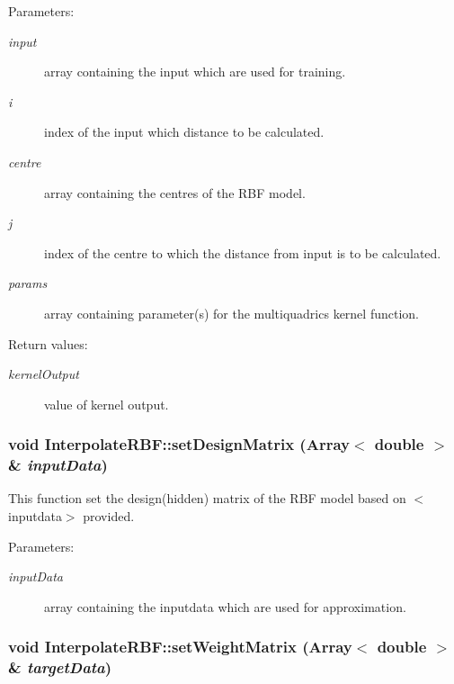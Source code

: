 \begin{Desc}
\item[Parameters:]
\begin{description}
\item[{\em input}]array containing the input which are used for training. \item[{\em i}]index of the input which distance to be calculated. \item[{\em centre}]array containing the centres of the RBF model. \item[{\em j}]index of the centre to which the distance from input is to be calculated. \item[{\em params}]array containing parameter(s) for the multiquadrics kernel function. \end{description}
\end{Desc}
\begin{Desc}
\item[Return values:]
\begin{description}
\item[{\em kernel\-Output}]value of kernel output.\end{description}
\end{Desc}
\subsubsection{\setlength{\rightskip}{0pt plus 5cm}void Interpolate\-RBF::set\-Design\-Matrix (Array$<$ double $>$ \& {\em input\-Data})}\label{classInterpolateRBF_a9}


This function set the design(hidden) matrix of the RBF model based on $<$inputdata$>$ provided. 

\begin{Desc}
\item[Parameters:]
\begin{description}
\item[{\em input\-Data}]array containing the inputdata which are used for approximation.\end{description}
\end{Desc}
\subsubsection{\setlength{\rightskip}{0pt plus 5cm}void Interpolate\-RBF::set\-Weight\-Matrix (Array$<$ double $>$ \& {\em target\-Data})}\label{classInterpolateRBF_a10}


